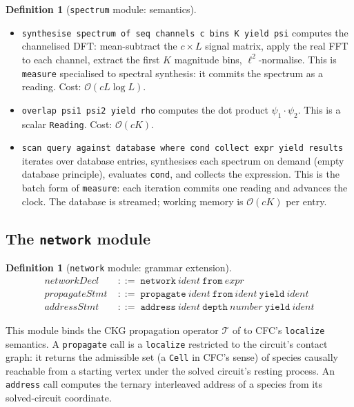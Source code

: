 \documentclass[11pt,a4paper]{article}
\theoremstyle{expthm}
\theoremstyle{definition}
\newtheorem{definition}[theorem]{Definition}
\theoremstyle{remark}
\newcommand{\cf}[1]{\texttt{#1}}
\begin{document}
\begin{definition}[\cf{spectrum} module: semantics]
\label{def:spectrum-sem}
\leavevmode
\begin{itemize}[leftmargin=1.4em,itemsep=2pt]
\item \cf{synthesise spectrum of seq channels c bins K yield psi}
  computes the channelised DFT: mean-subtract the $c \times L$ signal
  matrix, apply the real FFT to each channel, extract the first $K$
  magnitude bins, $\ell^2$-normalise. This is \cf{measure} specialised
  to spectral synthesis: it commits the spectrum as a reading. Cost:
  $\mathcal{O}(cL \log L)$.
\item \cf{overlap psi1 psi2 yield rho} computes the dot product
  $\psi_1 \cdot \psi_2$. This is a scalar \cf{Reading}. Cost:
  $\mathcal{O}(cK)$.
\item \cf{scan query against database where cond collect expr yield
  results} iterates over database entries, synthesises each spectrum on
  demand (empty database principle), evaluates \cf{cond}, and collects
  the expression. This is the batch form of \cf{measure}: each iteration
  commits one reading and advances the clock. The database is streamed;
  working memory is $\mathcal{O}(cK)$ per entry.
\end{itemize}
\end{definition}

\subsection{The \texttt{network} module}
\label{sec:ext-network}

\begin{definition}[\cf{network} module: grammar extension]
\label{def:network-grammar}
\begin{align*}
\textit{networkDecl} &\;::=\; \cf{network}\ \textit{ident}\
  \cf{from}\ \textit{expr}\\[2pt]
\textit{propagateStmt} &\;::=\; \cf{propagate}\ \textit{ident}\
  \cf{from}\ \textit{ident}\ \cf{yield}\ \textit{ident}\\[2pt]
\textit{addressStmt} &\;::=\; \cf{address}\ \textit{ident}\
  \cf{depth}\ \textit{number}\ \cf{yield}\ \textit{ident}
\end{align*}
\end{definition}

This module binds the CKG propagation operator $\mathcal{T}$ of
\citep{sachikonye2026ckg} to CFC's \cf{localize} semantics. A
\cf{propagate} call is a \cf{localize} restricted to the circuit's
contact graph: it returns the admissible set (a \cf{Cell} in CFC's
sense) of species causally reachable from a starting vertex under the
solved circuit's resting process. An \cf{address} call computes the
ternary interleaved address of a species from its solved-circuit
coordinate.
\end{document}
